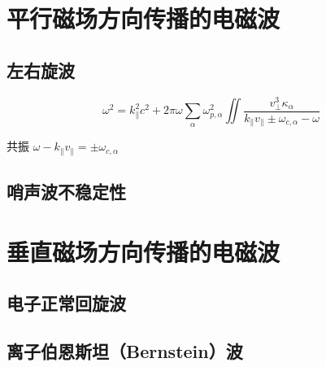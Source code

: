 \section{平行磁场方向传播的电磁波}

\subsection{左右旋波}

\begin{equation}
\omega^2 = k_\parallel^2 c^2 + 2 \pi \omega \sum_\alpha \omega_{p,\alpha}^2
\iint \frac{v_\perp^3 \kappa_\alpha}{k_\parallel v_\parallel \pm \omega_{c,\alpha} - \omega}
\end{equation}

共振 $\omega - k_\parallel v_\parallel = \pm \omega_{c,\alpha}$

\subsection{哨声波不稳定性}

\section{垂直磁场方向传播的电磁波}

\subsection{电子正常回旋波}

\subsection{离子伯恩斯坦（Bernstein）波}
